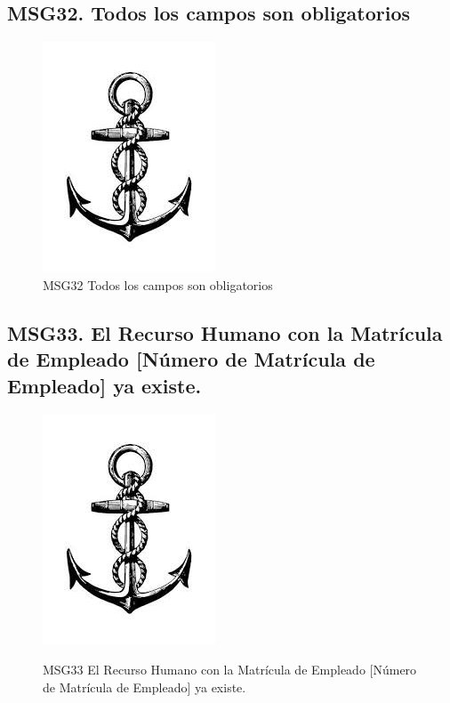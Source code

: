     \subsection{MSG32. Todos los campos son obligatorios}
        \begin{figure}[htbp]
            \begin{center}
                \includegraphics[width=.4\textwidth]{images/MSG/ancla}
                \caption{MSG32 Todos los campos son obligatorios}
                \label{fig:MSG32}
            \end{center}
        \end{figure}


    \subsection{MSG33. El Recurso Humano con la Matrícula de Empleado [Número de Matrícula de Empleado] ya existe.}
        \begin{figure}[htbp]
            \begin{center}
                \includegraphics[width=.4\textwidth]{images/MSG/ancla}
                \label{fig:MSG33}
                \caption{MSG33 El Recurso Humano con la Matrícula de Empleado [Número de Matrícula de Empleado] ya existe.}
            \end{center}
        \end{figure}


